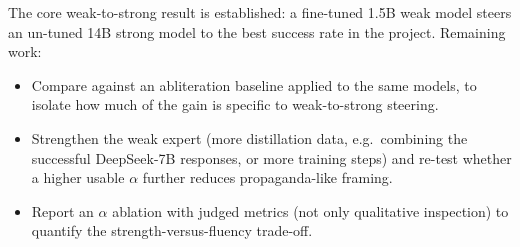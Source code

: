 \documentclass[11pt,a4paper]{article}
\begin{document}
The core weak-to-strong result is established: a fine-tuned 1.5B weak model steers an un-tuned 14B strong model to the best success rate in the project. Remaining work:
\begin{itemize}
    \item Compare against an abliteration baseline applied to the same models, to isolate how much of the gain is specific to weak-to-strong steering.
    \item Strengthen the weak expert (more distillation data, e.g.\ combining the successful DeepSeek-7B responses, or more training steps) and re-test whether a higher usable $\alpha$ further reduces propaganda-like framing.
    \item Report an $\alpha$ ablation with judged metrics (not only qualitative inspection) to quantify the strength-versus-fluency trade-off.
\end{itemize}
\end{document}
